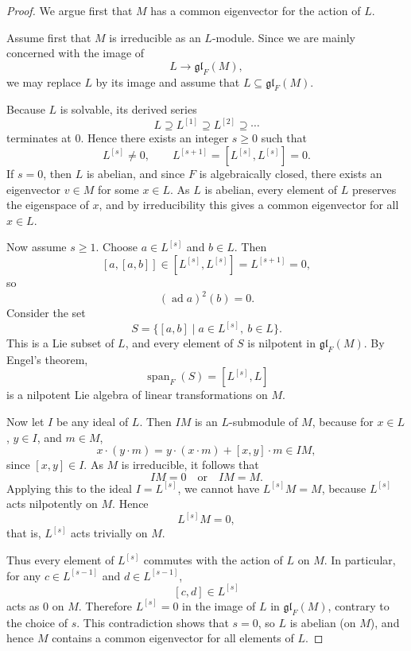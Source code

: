 \begin{proof}
    We argue first that $M$ has a common eigenvector for the action of $L$.

    Assume first that $M$ is irreducible as an $L$-module. Since we are mainly concerned
    with the image of
    \[
        L \to \mathfrak{gl}_F(M),
    \]
    we may replace $L$ by its image and assume that $L \subseteq \mathfrak{gl}_F(M)$.

    Because $L$ is solvable, its derived series
    \[
        L \supseteq L^{[1]} \supseteq L^{[2]} \supseteq \cdots
    \]
    terminates at $0$. Hence there exists an integer $s \ge 0$ such that
    \[
        L^{[s]} \neq 0,
        \qquad
        L^{[s+1]} = [L^{[s]},L^{[s]}]=0.
    \]
    If $s=0$, then $L$ is abelian, and since $F$ is algebraically closed, there exists
    an eigenvector $v \in M$ for some $x \in L$. As $L$ is abelian, every element of $L$
    preserves the eigenspace of $x$, and by irreducibility this gives a common eigenvector
    for all $x \in L$.

    Now assume $s \ge 1$. Choose $a \in L^{[s]}$ and $b \in L$. Then
    \[
        [a,[a,b]] \in [L^{[s]},L^{[s]}] = L^{[s+1]} = 0,
    \]
    so
    \[
        (\operatorname{ad} a)^2(b)=0.
    \]
    Consider the set
    \[
        S=\{[a,b]\mid a\in L^{[s]},\ b\in L\}.
    \]
    This is a Lie subset of $L$, and every element of $S$ is nilpotent in $\mathfrak{gl}_F(M)$.
    By Engel's theorem,
    \[
        \operatorname{span}_F(S)=[L^{[s]},L]
    \]
    is a nilpotent Lie algebra of linear transformations on $M$.

    Now let $I$ be any ideal of $L$. Then $IM$ is an $L$-submodule of $M$, because for
    $x\in L$, $y\in I$, and $m\in M$,
    \[
        x\cdot (y\cdot m)=y\cdot (x\cdot m)+[x,y]\cdot m \in IM,
    \]
    since $[x,y]\in I$. As $M$ is irreducible, it follows that
    \[
        IM=0 \quad \text{or} \quad IM=M.
    \]
    Applying this to the ideal $I=L^{[s]}$, we cannot have $L^{[s]}M=M$, because
    $L^{[s]}$ acts nilpotently on $M$. Hence
    \[
        L^{[s]}M=0,
    \]
    that is, $L^{[s]}$ acts trivially on $M$.

    Thus every element of $L^{[s]}$ commutes with the action of $L$ on $M$. In particular,
    for any $c\in L^{[s-1]}$ and $d\in L^{[s-1]}$,
    \[
        [c,d]\in L^{[s]}
    \]
    acts as $0$ on $M$. Therefore $L^{[s]}=0$ in the image of $L$ in $\mathfrak{gl}_F(M)$,
    contrary to the choice of $s$. This contradiction shows that $s=0$, so $L$ is abelian
    (on $M$), and hence $M$ contains a common eigenvector for all elements of $L$.


\end{proof}
